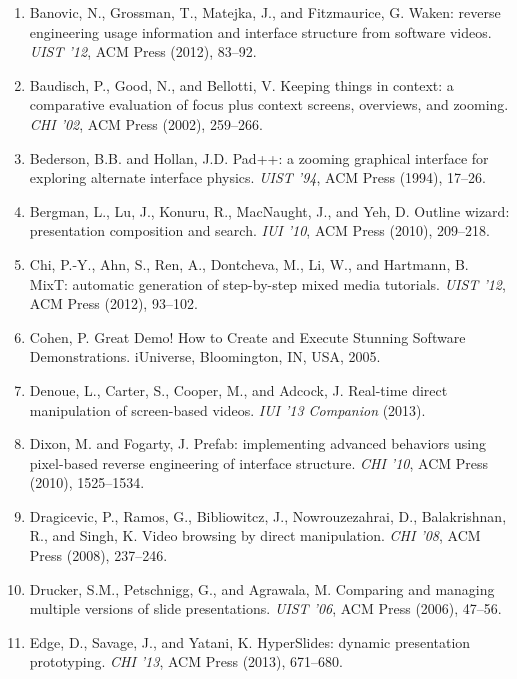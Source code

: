 \begin{enumerate}
\item \label{bkm:Ref240107863}Banovic, N., Grossman, T., Matejka, J., and Fitzmaurice, G. Waken: reverse engineering
usage information and interface structure from software videos. \textit{UIST ’12}, ACM Press (2012), 83–92.
\item \label{bkm:Ref240451958}Baudisch, P., Good, N., and Bellotti, V. Keeping things in context: a comparative
evaluation of focus plus context screens, overviews, and zooming. \textit{CHI ’02}, ACM Press (2002), 259–266.
\item \label{bkm:Ref240449626}Bederson, B.B. and Hollan, J.D. Pad++: a zooming graphical interface for exploring
alternate interface physics. \textit{UIST ’94}, ACM Press (1994), 17–26.
\item \label{bkm:Ref240137030}Bergman, L., Lu, J., Konuru, R., MacNaught, J., and Yeh, D. Outline wizard: presentation
composition and search. \textit{IUI ’10}, ACM Press (2010), 209–218.
\item \label{bkm:Ref240442979}Chi, P.-Y., Ahn, S., Ren, A., Dontcheva, M., Li, W., and Hartmann, B. MixT: automatic
generation of step-by-step mixed media tutorials. \textit{UIST ’12}, ACM Press (2012), 93–102.
\item \label{bkm:Ref367060881}Cohen, P. Great Demo! How to Create and Execute Stunning Software Demonstrations.
iUniverse, Bloomington, IN, USA, 2005.
\item \label{bkm:Ref367064043}Denoue, L., Carter, S., Cooper, M., and Adcock, J. Real-time direct manipulation of
screen-based videos. \textit{IUI ’13 Companion} (2013).
\item \label{bkm:Ref240108076}Dixon, M. and Fogarty, J. Prefab: implementing advanced behaviors using pixel-based
reverse engineering of interface structure. \textit{CHI ’10}, ACM Press (2010), 1525–1534.
\item \label{bkm:Ref240444667}Dragicevic, P., Ramos, G., Bibliowitcz, J., Nowrouzezahrai, D., Balakrishnan, R., and
Singh, K. Video browsing by direct manipulation. \textit{CHI ’08}, ACM Press (2008), 237–246.
\item \label{bkm:Ref240137063}Drucker, S.M., Petschnigg, G., and Agrawala, M. Comparing and managing multiple versions
of slide presentations. \textit{UIST ’06}, ACM Press (2006), 47–56.
\item \label{bkm:Ref240136931}Edge, D., Savage, J., and Yatani, K. HyperSlides: dynamic presentation prototyping.
\textit{CHI ’13}, ACM Press (2013), 671–680.

\end{enumerate}
